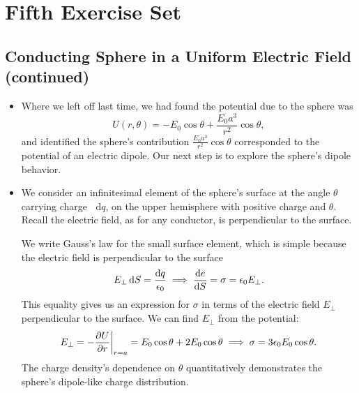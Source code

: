 \documentclass[11pt, a4paper]{article}
\newcommand{\diff}{\mathop{}\!\mathrm{d}} %
\newcommand{\ee}{\epsilon_{0}}  %
\begin{document}
\newpage
\section{Fifth Exercise Set}

\subsection{Conducting Sphere in a Uniform Electric Field (continued)}
\begin{itemize}
	\item Where we left off last time, we had found the potential due to the sphere was
	\begin{equation*}
		U(r, \theta) = - E_{0} \cos \theta + \frac{E_{0}a^{3}}{r^{2}}\cos \theta,
	\end{equation*}
	and identified the sphere's contribution $ \frac{E_{0}a^{3}}{r^{2}}\cos \theta $ corresponded to the potential of an electric dipole. Our next step is to explore the sphere's dipole behavior.
	
	\item We consider an infinitesimal element of the sphere's surface at the angle $ \theta $ carrying charge $ \diff q $, on the upper hemisphere with positive charge and $ \theta $. Recall the electric field, as for any conductor, is perpendicular to the surface. 
	
	We write Gauss's law for the small surface element, which is simple because the electric field is perpendicular to the surface
	\begin{equation*}
		E_{\perp} \diff S = \frac{\diff q}{\ee} \implies \dv{e}{S} = \sigma = \ee E_{\perp}.
	\end{equation*}
	This equality gives us an expression for $ \sigma $ in terms of the electric field $ E_{\perp} $ perpendicular to the surface. We can find $ E_{\perp} $ from the potential:
	\begin{equation*}
		E_{\perp} = -\pdv{U}{r}\bigg |_{r = a} = E_{0}\cos \theta + 2E_{0}\cos \theta \implies \sigma = 3\ee E_{0} \cos \theta.
	\end{equation*}
	The charge density's dependence on $ \theta $ quantitatively demonstrates the sphere's dipole-like charge distribution. 
	

\end{itemize}
\end{document}
